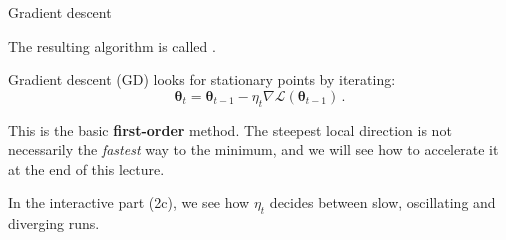 \documentclass[11pt,aspectratio=169]{beamer}
\begin{document}
\begin{frame}{Gradient descent}

	The resulting algorithm is called .

	\begin{tcolorbox}[nndsgreen]
		Gradient descent (GD) looks for stationary points by iterating:
		\[
			\boldsymbol{\theta}_t = \boldsymbol{\theta}_{t-1} - \eta_t \nabla \mathcal{L}(\boldsymbol{\theta}_{t-1}) \,.
		\]
	\end{tcolorbox}

	This is the basic \textbf{first-order} method. The steepest local direction is not necessarily the \textit{fastest} way to the minimum, and we will see how to accelerate it at the end of this lecture.

	In the interactive part (2c), we see how $\eta_t$ decides between slow, oscillating and diverging runs.

\end{frame}
\end{document}
